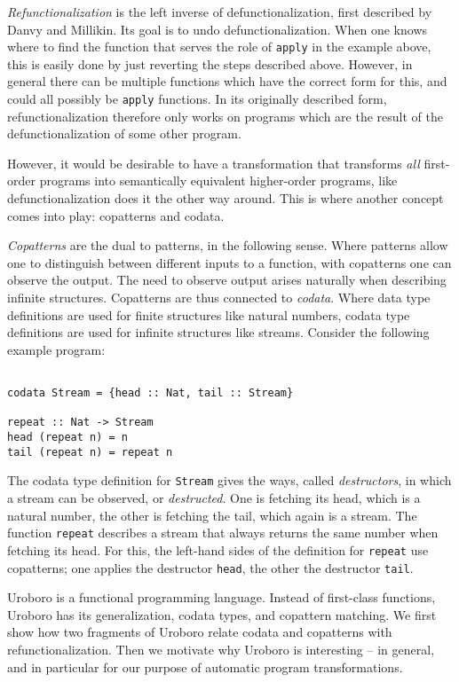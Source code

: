 \textit{Refunctionalization} is the left inverse of defunctionalization, first described by Danvy and Millikin\cite{danvy09refunctionalization}. Its goal is to undo defunctionalization. When one knows where to find the function that serves the role of \texttt{apply} in the example above, this is easily done by just reverting the steps described above. However, in general there can be multiple functions which have the correct form for this, and could all possibly be \texttt{apply} functions. In its originally described form, refunctionalization therefore only works on programs which are the result of the defunctionalization of some other program.

However, it would be desirable to have a transformation that transforms \textit{all} first-order programs into semantically equivalent higher-order programs, like defunctionalization does it the other way around. This is where another concept comes into play: copatterns and codata.

\textit{Copatterns} are the dual to patterns, in the following sense. Where patterns allow one to distinguish between different inputs to a function, with copatterns one can observe the output. The need to observe output arises naturally when describing infinite structures. Copatterns are thus connected to \textit{codata}. Where data type definitions are used for finite structures like natural numbers, codata type definitions are used for infinite structures like streams. Consider the following example program:

\begin{lstlisting}

codata Stream = {head :: Nat, tail :: Stream}

repeat :: Nat -> Stream
head (repeat n) = n
tail (repeat n) = repeat n

\end{lstlisting}

The codata type definition for \texttt{Stream} gives the ways, called \textit{destructors}, in which a stream can be observed, or \textit{destructed}. One is fetching its head, which is a natural number, the other is fetching the tail, which again is a stream. The function \texttt{repeat} describes a stream that always returns the same number when fetching its head. For this, the left-hand sides of the definition for \texttt{repeat} use copatterns; one applies the destructor \texttt{head}, the other the destructor \texttt{tail}.

Uroboro is a functional programming language. Instead of first-class functions, Uroboro has its generalization, codata types, and copattern matching. We first show how two fragments of Uroboro relate codata and copatterns with refunctionalization. Then we motivate why Uroboro is interesting -- in general, and in particular for our purpose of automatic program transformations.

